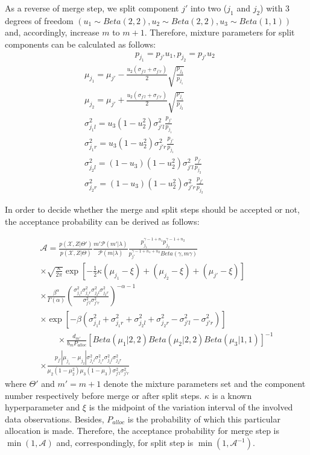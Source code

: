 \documentclass[conference]{IEEEtran}
\begin{document}
As a reverse of merge step, we split component $j'$ into two ($j_1$ and $j_2$) with 3 degrees of freedom $(u_1 \sim Beta(2,2), u_2 \sim Beta(2,2), u_3 \sim Beta(1,1))$ and, accordingly, increase $m$ to $m+1$. Therefore, mixture parameters for split components can be calculated as follows:
\begin{multline}
\qquad\qquad\qquad p_{j_1} = p_{j'}u_1, p_{j_2} = p_{j'}u_2 \\
\mu_{j_1} = \mu_{j'} - \frac{u_2(\sigma_{j'l}+\sigma_{j'r})}{2} \sqrt{\frac{p_{j_2}}{p_{j_1}}} \\
\mu_{j_2} = \mu_{j'} + \frac{u_2(\sigma_{j'l}+\sigma_{j'r})}{2} \sqrt{\frac{p_{j_1}}{p_{j_2}}} \\
\sigma_{j_1l}^2 = u_3(1-u_2^2)\sigma_{j'l}^2\frac{p_{j'}}{p_{j_1}} \\
\sigma_{j_1r}^2 = u_3(1-u_2^2)\sigma_{j'r}^2\frac{p_{j'}}{p_{j_1}} \\
\sigma_{j_2l}^2 = (1-u_3)(1-u_2^2)\sigma_{j'l}^2\frac{p_{j'}}{p_{j_2}} \\
\sigma_{j_2r}^2 = (1-u_3)(1-u_2^2)\sigma_{j'r}^2\frac{p_{j'}}{p_{j_2}} \qquad\quad
\label{eq:split}
\end{multline}

In order to decide whether the merge and split steps should be accepted or not, the acceptance probability \cite{Richardson1997} can be derived as follows: 

\begin{multline}
\mathcal{A}=\frac{p(\mathcal{X},Z|\Theta')}{p(\mathcal{X},Z|\Theta)}\frac{m'\mathcal{P}(m'|\lambda)}{\mathcal{P}(m|\lambda)}\frac{p_{j_1}^{\gamma-1+n_1}p_{j_2}^{\gamma-1+n_2}}{p_{j'}^{\gamma-1+n_1+n_2}Beta(\gamma,m\gamma)} \\
\times \sqrt{\frac{\kappa}{2\pi}} \exp[-\frac{1}{2}\kappa{(\mu_{j_1}-\xi)+(\mu_{j_2}-\xi)+(\mu_{j'}-\xi)}] \\
\times \frac{\beta^{\alpha}}{\Gamma(\alpha)}(\frac{\sigma_{j_1l}^2\sigma_{j_1r}^2\sigma_{j_2l}^2\sigma_{j_2r}^2}{\sigma_{j'l}^2\sigma_{j'r}^2})^{-\alpha-1} \qquad\qquad\qquad\qquad\\
\times \exp [{-\beta(\sigma_{j_1l}^2+\sigma_{j_1r}^2+\sigma_{j_2l}^2+\sigma_{j_2r}^2-\sigma_{j'l}^2-\sigma_{j'r}^2)}] \\
\qquad\times \frac{d_{m'}}{b_mP_{alloc}} [Beta(\mu_1|2,2)Beta(\mu_2|2,2)Beta(\mu_3|1,1)]^{-1} \\
\times \frac{p_{j'}|\mu_{j_1}-\mu_{j_2}|\sigma_{j_1l}^2\sigma_{j_1r}^2\sigma_{j_2l}^2\sigma_{j_2r}^2}{\mu_2(1-\mu_2^2)\mu_3(1-\mu_3)\sigma_{j'l}^2\sigma_{j'r}^2} \qquad\qquad\qquad\quad
\label{eq:acptProMS}
\end{multline}
where $\Theta'$ and $m' = m + 1$ denote the mixture parameters set and the component number respectively before merge or after split steps. $\kappa$ is a known hyperparameter and $\xi$ is the midpoint of the variation interval of the involved data observations. Besides, $P_{alloc}$ is the probability of which this particular allocation is made. Therefore, the acceptance probability for merge step is $\min(1,\mathcal{A})$ and, correspondingly, for split step is $\min(1,\mathcal{A}^{-1})$.
\end{document}
